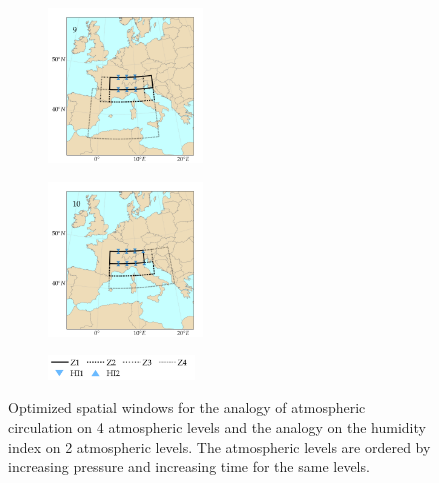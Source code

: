 \documentclass[twocol]{ametsoc}
\begin{document}
\begin{figure}[htb]
\begin{subfigure}{.5\columnwidth}
	\end{subfigure}
	\begin{subfigure}{.5\columnwidth}
		\centering
		\includegraphics[width=4.1cm]{figures/spatial_win_z4-hi2/Spatial_windows_9.png}
	\end{subfigure}%
	\begin{subfigure}{.5\columnwidth}
		\centering
		\includegraphics[width=4.1cm]{figures/spatial_win_z4-hi2/Spatial_windows_10.png}
	\end{subfigure}
	\begin{subfigure}{.5\columnwidth}
		\centering
		\includegraphics[width=3.9cm]{figures/spatial_win_z4-hi2/legend.png}
	\end{subfigure}
	\caption{Optimized spatial windows for the analogy of atmospheric circulation on 4 atmospheric levels and the analogy on the humidity index on 2 atmospheric levels. The atmospheric levels are ordered by increasing pressure and increasing time for the same levels.}
	\label{fig:spatial_windows_z4-hi2}
\end{figure}
\end{document}
